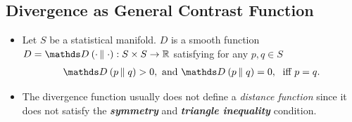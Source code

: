 \documentclass[11pt]{article}
\begin{document}
\subsection{Divergence as General Contrast Function}
\begin{itemize}
\item \begin{definition}
Let $S$ be a statistical manifold. $D$ is a smooth function $D = \divg{}{\cdot}{\cdot}: S \times S  \rightarrow  \bR$ satisfying for any $p,q \in S$
\begin{align}
\divg{}{p}{q} > 0,  \text{ and }  \divg{}{p}{q} = 0, \; \text{ iff }p=q.
  \label{eqn: divergence_def}
\end{align}
\end{definition}

\item The divergence function usually does not define a \emph{distance function} since it does not satisfy the \emph{\textbf{symmetry}} and \emph{\textbf{triangle inequality}} condition. 


\end{itemize}
\end{document}

